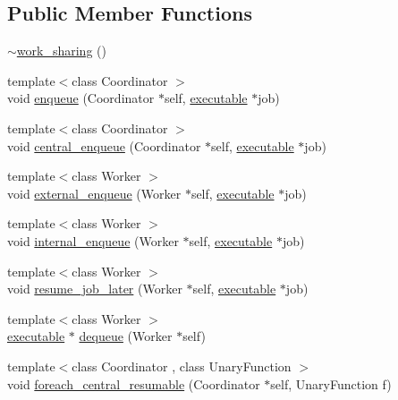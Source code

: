 \subsection*{Public Member Functions}
\begin{DoxyCompactItemize}
\item 
\hyperlink{classactor__zeta_1_1executor_1_1work__sharing_a9cdcd201ba45a67964c5f38c31ec7014}{$\sim$work\+\_\+sharing} ()
\item 
{\footnotesize template$<$class Coordinator $>$ }\\void \hyperlink{classactor__zeta_1_1executor_1_1work__sharing_a8b35723bd97f41af9a2a0b0e41a12134}{enqueue} (Coordinator $\ast$self, \hyperlink{structactor__zeta_1_1executor_1_1executable}{executable} $\ast$job)
\item 
{\footnotesize template$<$class Coordinator $>$ }\\void \hyperlink{classactor__zeta_1_1executor_1_1work__sharing_a6c9cc365c9d02574ac626d093eb4a221}{central\+\_\+enqueue} (Coordinator $\ast$self, \hyperlink{structactor__zeta_1_1executor_1_1executable}{executable} $\ast$job)
\item 
{\footnotesize template$<$class Worker $>$ }\\void \hyperlink{classactor__zeta_1_1executor_1_1work__sharing_a594aa82538f4ecdd9613cfdf07851c02}{external\+\_\+enqueue} (Worker $\ast$self, \hyperlink{structactor__zeta_1_1executor_1_1executable}{executable} $\ast$job)
\item 
{\footnotesize template$<$class Worker $>$ }\\void \hyperlink{classactor__zeta_1_1executor_1_1work__sharing_a033f2d355e87c707d6467b8c0c85e925}{internal\+\_\+enqueue} (Worker $\ast$self, \hyperlink{structactor__zeta_1_1executor_1_1executable}{executable} $\ast$job)
\item 
{\footnotesize template$<$class Worker $>$ }\\void \hyperlink{classactor__zeta_1_1executor_1_1work__sharing_a74e9c2f71b9a8365e0f0712d625f2279}{resume\+\_\+job\+\_\+later} (Worker $\ast$self, \hyperlink{structactor__zeta_1_1executor_1_1executable}{executable} $\ast$job)
\item 
{\footnotesize template$<$class Worker $>$ }\\\hyperlink{structactor__zeta_1_1executor_1_1executable}{executable} $\ast$ \hyperlink{classactor__zeta_1_1executor_1_1work__sharing_ad889ed60c2d52beef083d3854e87e40b}{dequeue} (Worker $\ast$self)
\item 
{\footnotesize template$<$class Coordinator , class Unary\+Function $>$ }\\void \hyperlink{classactor__zeta_1_1executor_1_1work__sharing_a65e0a47d49b1fcd434b09c39210b143c}{foreach\+\_\+central\+\_\+resumable} (Coordinator $\ast$self, Unary\+Function f)
\end{DoxyCompactItemize}


